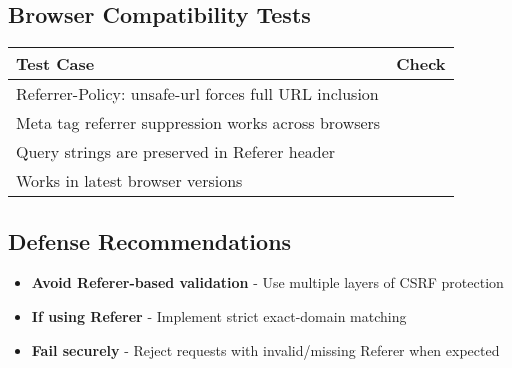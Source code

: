 \documentclass{article}
\begin{document}
\subsection*{Browser Compatibility Tests}
\begin{tabular}{>{\raggedright\arraybackslash}p{}c}
    \toprule
    \textbf{Test Case} & \textbf{Check} \\
    \midrule
    Referrer-Policy: unsafe-url forces full URL inclusion  \\
    Meta tag referrer suppression works across browsers \\
    Query strings are preserved in Referer header \\
    Works in latest browser versions \\
    \bottomrule
\end{tabular}

\subsection*{Defense Recommendations}
\begin{itemize}
    \item \textbf{Avoid Referer-based validation} - Use multiple layers of CSRF protection
    \item \textbf{If using Referer} - Implement strict exact-domain matching
    \item \textbf{Fail securely} - Reject requests with invalid/missing Referer when expected
\end{itemize}
\end{document}
